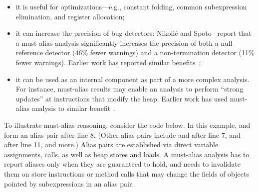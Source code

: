 \begin{itemize}
    \item it is useful for %
        optimizations---e.g., constant folding,
		common subexpression elimination, and register allocation;
	\item it can increase the precision of bug detectors: Nikoli\'{c} and
		Spoto~\cite{DBLP:conf/ictac/NikolicS12} report that a must-alias
		analysis significantly increases the precision of both a null-reference
		detector (46\% fewer warnings) and a non-termination detector (11\%
		fewer warnings). Earlier work has reported similar
		benefits~\cite{DBLP:conf/isola/MaWD08};
	\item it can be used as an internal component as part of a more complex
		analysis. For instance, must-alias results may enable an analysis to
		perform ``strong updates'' at instructions that modify the heap.
		Earlier work has used must-alias analysis to similar
		benefit~\cite{emami-etal-pldi94,Jagannathan:1998:SLM:268946.268973}.
\end{itemize}

To illustrate must-alias reasoning, consider 
the code below. In this example,  and  form an alias pair
after line 8. (Other alias pairs include  and  after line 7,
 and  after line 11, and more.)
Alias pairs are established via direct
variable assignments, calls, as well as heap stores and loads. A must-alias analysis
has to report aliases only when they are guaranteed to hold, and needs to
invalidate them on store instructions or method calls that may change the
fields of objects pointed by subexpressions in an alias pair.

